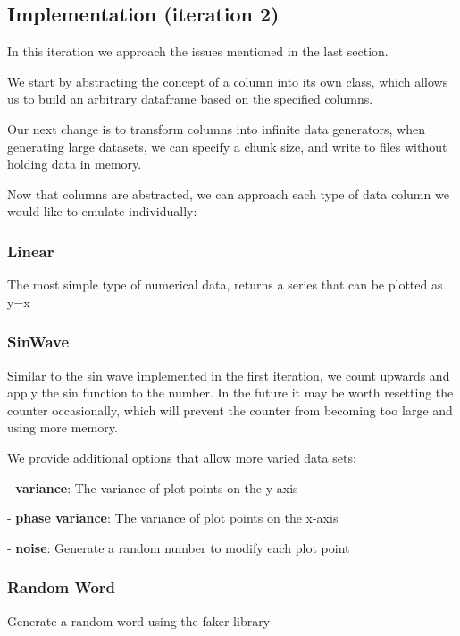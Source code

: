 \subsection{Implementation (iteration 2)}\label{subsec:implementation-(iteration-2)}

In this iteration we approach the issues mentioned in the last section.

We start by abstracting the concept of a column into its own class, which allows us to build an arbitrary dataframe
based on the specified columns.

Our next change is to transform columns into infinite data generators, when generating large datasets, we can specify
a chunk size, and write to files without holding data in memory.

Now that columns are abstracted, we can approach each type of data column we would like to emulate individually:

\subsubsection{Linear}

The most simple type of numerical data, returns a series that can be plotted as y=x


\subsubsection{SinWave}

Similar to the sin wave implemented in the first iteration, we count upwards and apply the sin function to the number.
In the future it may be worth resetting the counter occasionally, which will prevent the counter from becoming too large
and using more memory.

We provide additional options that allow more varied data sets:

- \textbf{variance}: The variance of plot points on the y-axis

- \textbf{phase variance}: The variance of plot points on the x-axis

- \textbf{noise}: Generate a random number to modify each plot point


\subsubsection{Random Word}

Generate a random word using the faker library
